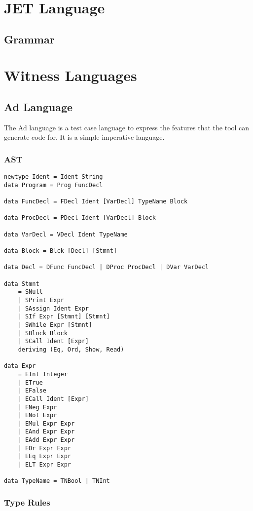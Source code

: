\appendix

\chapter{JET Language}
\label{appendix:jetLanguage}
\section{Grammar}

\chapter{Witness Languages}
\label{appendix:witnessLanguages}
\section{Ad Language}
The Ad language is a test case language to express the features that the tool can generate code for.
It is a simple imperative language.
\subsection{AST}
\begin{lstlisting}
newtype Ident = Ident String
data Program = Prog FuncDecl

data FuncDecl = FDecl Ident [VarDecl] TypeName Block

data ProcDecl = PDecl Ident [VarDecl] Block

data VarDecl = VDecl Ident TypeName

data Block = Blck [Decl] [Stmnt]

data Decl = DFunc FuncDecl | DProc ProcDecl | DVar VarDecl

data Stmnt
    = SNull
    | SPrint Expr
    | SAssign Ident Expr
    | SIf Expr [Stmnt] [Stmnt]
    | SWhile Expr [Stmnt]
    | SBlock Block
    | SCall Ident [Expr]
    deriving (Eq, Ord, Show, Read)

data Expr
    = EInt Integer
    | ETrue
    | EFalse
    | ECall Ident [Expr]
    | ENeg Expr
    | ENot Expr
    | EMul Expr Expr
    | EAnd Expr Expr
    | EAdd Expr Expr
    | EOr Expr Expr
    | EEq Expr Expr
    | ELT Expr Expr

data TypeName = TNBool | TNInt
\end{lstlisting}

\subsection{Type Rules}
